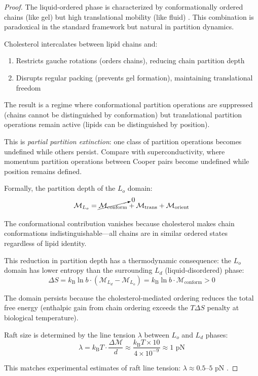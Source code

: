 \documentclass[twocolumn,10pt]{article}
\theoremstyle{remark}
\newcommand{\kB}{k_{\mathrm{B}}}
\newcommand{\Depth}{\mathcal{M}}
\begin{document}
\begin{proof}
The liquid-ordered phase is characterized by conformationally ordered chains (like gel) but high translational mobility (like fluid) \cite{veatch2003,lingwood2010}. This combination is paradoxical in the standard framework but natural in partition dynamics.

Cholesterol intercalates between lipid chains and:
\begin{enumerate}
    \item Restricts gauche rotations (orders chains), reducing chain partition depth
    \item Disrupts regular packing (prevents gel formation), maintaining translational freedom
\end{enumerate}

The result is a regime where conformational partition operations are suppressed (chains cannot be distinguished by conformation) but translational partition operations remain active (lipids can be distinguished by position).

This is \emph{partial partition extinction}: one class of partition operations becomes undefined while others persist. Compare with superconductivity, where momentum partition operations between Cooper pairs become undefined while position remains defined.

Formally, the partition depth of the $L_o$ domain:
\begin{equation}
    \Depth_{L_o} = \cancelto{0}{\Depth_{\text{conform}}} + \Depth_{\text{trans}} + \Depth_{\text{orient}}
\end{equation}

The conformational contribution vanishes because cholesterol makes chain conformations indistinguishable---all chains are in similar ordered states regardless of lipid identity.

This reduction in partition depth has a thermodynamic consequence: the $L_o$ domain has lower entropy than the surrounding $L_d$ (liquid-disordered) phase:
\begin{equation}
    \Delta S = \kB \ln b \cdot (\Depth_{L_d} - \Depth_{L_o}) = \kB \ln b \cdot \Depth_{\text{conform}} > 0
\end{equation}

The domain persists because the cholesterol-mediated ordering reduces the total free energy (enthalpic gain from chain ordering exceeds the $T\Delta S$ penalty at biological temperature).

Raft size is determined by the line tension $\lambda$ between $L_o$ and $L_d$ phases:
\begin{equation}
    \lambda = \kB T \cdot \frac{\Delta\Depth}{d} \approx \frac{\kB T \times 10}{4 \times 10^{-9}} \approx 1 \text{ pN}
\end{equation}

This matches experimental estimates of raft line tension: $\lambda \approx 0.5$--$5$ pN \cite{baumgart2003,veatch2005}.
\end{proof}
\end{document}
